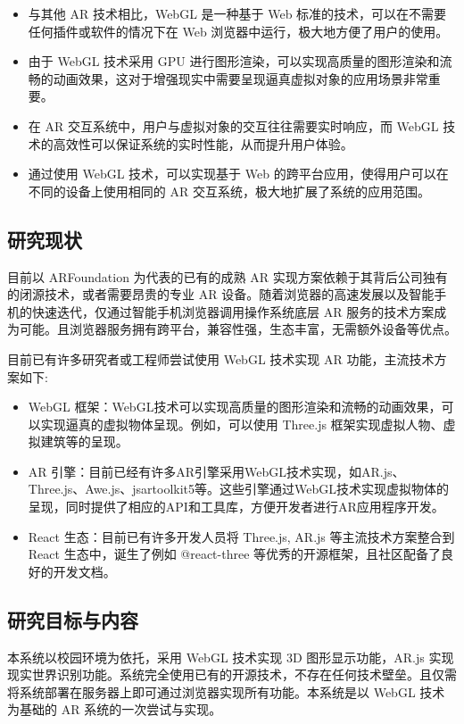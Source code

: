 \begin{itemize}
  \item 与其他 AR 技术相比，WebGL 是一种基于 Web 标准的技术，可以在不需要任何插件或软件的情况下在 Web 浏览器中运行，极大地方便了用户的使用。
  \item 由于 WebGL 技术采用 GPU 进行图形渲染，可以实现高质量的图形渲染和流畅的动画效果，这对于增强现实中需要呈现逼真虚拟对象的应用场景非常重要。
  \item 在 AR 交互系统中，用户与虚拟对象的交互往往需要实时响应，而 WebGL 技术的高效性可以保证系统的实时性能，从而提升用户体验。
  \item 通过使用 WebGL 技术，可以实现基于 Web 的跨平台应用，使得用户可以在不同的设备上使用相同的 AR 交互系统，极大地扩展了系统的应用范围。
\end{itemize}

\subsection{研究现状}

目前以 ARFoundation 为代表的已有的成熟 AR 实现方案依赖于其背后公司独有的闭源技术，或者需要昂贵的专业 AR 设备。随着浏览器的高速发展以及智能手机的快速迭代，仅通过智能手机浏览器调用操作系统底层 AR 服务的技术方案成为可能\cite{ARMobile}。且浏览器服务拥有跨平台，兼容性强，生态丰富，无需额外设备等优点。

目前已有许多研究者或工程师尝试使用 WebGL 技术实现 AR 功能，主流技术方案如下:
\begin{itemize}
  \item WebGL 框架：WebGL技术可以实现高质量的图形渲染和流畅的动画效果，可以实现逼真的虚拟物体呈现。例如，可以使用 Three.js 框架实现虚拟人物、虚拟建筑等的呈现。
  \item AR 引擎：目前已经有许多AR引擎采用WebGL技术实现，如AR.js、Three.js、Awe.js、jsartoolkit5等。这些引擎通过WebGL技术实现虚拟物体的呈现，同时提供了相应的API和工具库，方便开发者进行AR应用程序开发。
  \item React 生态：目前已有许多开发人员将 Three.js, AR.js 等主流技术方案整合到 React 生态中，诞生了例如 @react-three 等优秀的开源框架，且社区配备了良好的开发文档。
\end{itemize}

\subsection{研究目标与内容}

本系统以校园环境为依托，采用 WebGL 技术实现 3D 图形显示功能，AR.js 实现现实世界识别功能。系统完全使用已有的开源技术，不存在任何技术壁垒。且仅需将系统部署在服务器上即可通过浏览器实现所有功能。本系统是以 WebGL 技术为基础的 AR 系统的一次尝试与实现。

